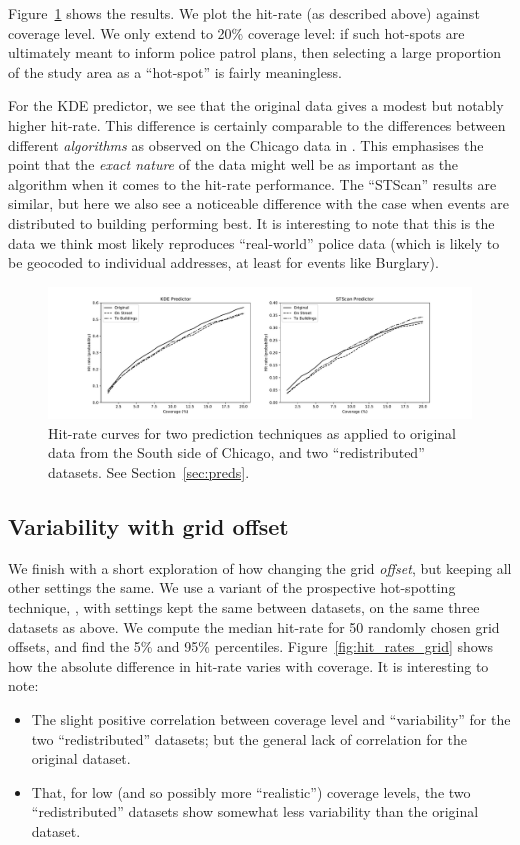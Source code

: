 \documentclass[twoside,a4paper,twocolumn,10pt]{article}
\theoremstyle{plain}
\theoremstyle{definition}
\begin{document}
Figure~\ref{fig:hit_rates} shows the results.  We plot the hit-rate (as described above) against
coverage level.  We only extend to 20\% coverage level: if such hot-spots are ultimately
meant to inform police patrol plans, then selecting a large proportion of the study area as a
``hot-spot'' is fairly meaningless.

For the KDE predictor, we see that the original data gives a modest but notably higher
hit-rate.  This difference is certainly comparable to the differences between different
\emph{algorithms} as observed on the Chicago data in \cite{arc}.  This emphasises the point
that the \emph{exact nature} of the data might well be as important as the algorithm when it
comes to the hit-rate performance.  The ``STScan'' results are similar, but here we also
see a noticeable difference with the case when events are distributed to building performing
best.  It is interesting to note that this is the data we think most likely reproduces
``real-world'' police data (which is likely to be geocoded to individual addresses, at least
for events like Burglary).

\begin{figure}
  \includegraphics[width=\textwidth]{hit_rates.pdf}
  \caption{Hit-rate curves for two prediction techniques as applied to original data from
  the South side of Chicago, and two ``redistributed'' datasets.  See Section~\ref{sec:preds}.}
  \label{fig:hit_rates}
\end{figure}


\subsection{Variability with grid offset}\label{sec:preds_grid}

We finish with a short exploration of how changing the grid \emph{offset}, but keeping all
other settings the same.  We use a variant of the prospective hot-spotting technique,
\cite{bjp}, with settings kept the same between datasets, on the same three datasets as above.
We compute the median hit-rate for 50 randomly chosen grid offsets, and find the 5\% and 95\%
percentiles.  Figure~\ref{fig:hit_rates_grid} shows how the absolute difference in hit-rate
varies with coverage.  It is interesting to note:
\begin{itemize}
\item The slight positive correlation between coverage level and ``variability'' for
the two ``redistributed'' datasets; but the general lack of correlation for the original
dataset.
\item That, for low (and so possibly more ``realistic'') coverage levels, the two
``redistributed'' datasets show somewhat less variability than the original dataset.
\end{itemize}
\end{document}

